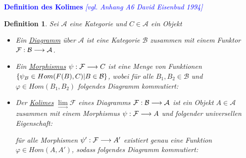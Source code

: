 \documentclass[10pt,a4paper]{report}
\newcommand{\comment}[1]{}
\newcommand{\ModulsOfDifferenzials}{David Eisenbud 1994}
\newcounter{Aussage}[chapter]
\newtheorem{definition}[Aussage]{Definition}
\newcommand{\functionfront}[3]{\nolinebreak{#1:#2 \longrightarrow #3}}
\newcommand{\colimes}[0]{\lim\limits_{ \longrightarrow }}
\begin{document}
\textcolor{blue}{\textbf{Definition des Kolimes} \textit{[vgl. Anhang A6 \ModulsOfDifferenzials]}}
\begin{definition}\comment{\label{Definition des Kolimes}}
Sei $\mathcal{A}$ eine Kategorie und $C \in \mathcal{A}$ ein Objekt
\begin{itemize}
\item Ein \underline{Diagramm} über $\mathcal{A}$ ist eine Kategorie $\mathcal{B}$ zusammen mit einem Funktor $\functionfront{\mathcal{F}}{\mathcal{B}}{\mathcal{A}}$.
\item Ein \underline{Morphismus} $\functionfront{\psi}{\mathcal{F}}{C}$ ist eine Menge von Funktionen 
$\nolinebreak{\lbrace \psi_B \in Hom(F(B),C) \vert B \in \mathcal{B} \rbrace}$, wobei für alle $B_1,B_2 \in \mathcal{B}$ und $\varphi \in Hom(B_1,B_2)$ folgendes Diagramm kommutiert:
\begin{center}
\end{center}
\item Der \underline{Kolimes} $\colimes \mathcal{F}$ eines Diagramms $\functionfront{\mathcal{F}}{\mathcal{B}}{\mathcal{A}}$ ist ein Objekt $A \in \mathcal{A}$ zusammen mit einem Morphismus $\functionfront{\psi}{\mathcal{F}}{A}$ und folgender universellen Eigenschaft:
\begin{center}
\comment{$\forall Morphismen \functionfront{\psi '}{\mathcal{F}}{\mathcal{A}'}\exists ! \varphi \in Hom_{\mathcal{A}}(A,A') \forall B \in \mathcal{B}: \varphi \circ \psi_B = \psi'_B $}

für alle Morphismen $\functionfront{\psi '}{\mathcal{F}}{A'}$ existiert genau eine Funktion $\varphi \in Hom(A,A')$, sodass folgendes Diagramm kommutiert:
\end{center}
\end{itemize}
\end{definition}
\end{document}

